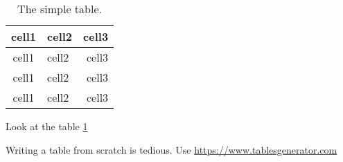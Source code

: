 \documentclass{article}
\begin{document}
\begin{table}[h]
    \begin{center}
        \begin{tabular}{|c|l|r|}
            \hline
            \textbf{cell1} & cell2 & cell3 \\
            \hline\hline
            cell1 & cell2 & cell3 \\
            cell1 & cell2 & cell3 \\
            cell1 & cell2 & cell3 \\
            \hline
        \end{tabular}
        \caption{\label{tab:table}The simple table.}
    \end{center}
\end{table}

Look at the table \ref{tab:table}

\begin{sloppypar}
Writing a table from scratch is tedious. Use \url{https://www.tablesgenerator.com}
\end{sloppypar}
\end{document}
